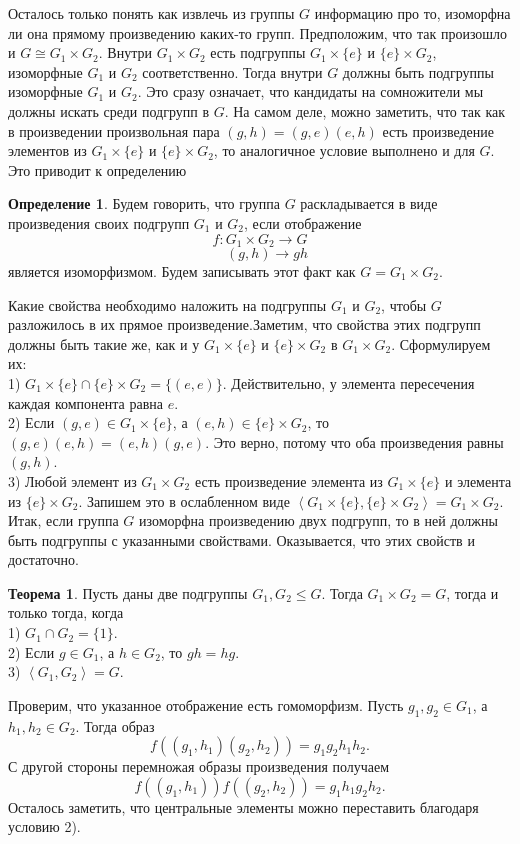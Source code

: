 \documentclass[10pt,a4paper,oneside]{book}
\theoremstyle{definition}
\newtheorem*{defn}{\color{yellow!30!red} Определение}
\newtheorem{thm}{\color{red!40!black}Теорема}
\renewcommand{\leq}{\leqslant}
\def\lan{\left\langle }
\def\ran{\right\rangle}
\def\thrm{\begin{thm}}
\def\ethrm{\end{thm}}
\def\dfn{\begin{defn}}
\def\edfn{\end{defn}}
\begin{document}
Осталось только понять как извлечь из группы $G$ информацию про то, изоморфна ли она прямому произведению каких-то групп. Предположим, что так произошло и $G\cong G_1\times G_2$. Внутри $G_1\times G_2$ есть подгруппы $G_1\times \{e\}$ и $\{e\}\times G_2$, изоморфные $G_1$ и $G_2$ соответственно. Тогда внутри $G$ должны быть подгруппы изоморфные $G_1$ и $G_2$. Это сразу означает, что кандидаты на сомножители мы должны искать среди подгрупп в $G$. На самом деле, можно заметить, что так как в произведении произвольная пара $(g,h)=(g,e)(e,h)$ есть произведение элементов из $G_1\times \{e\}$ и $\{e\}\times G_2$, то аналогичное условие выполнено и для $G$. Это приводит к определению

\dfn Будем говорить, что группа $G$ раскладывается в виде произведения своих подгрупп $G_1$ и $G_2$, если отображение
$$f\colon G_1\times G_2 \to G$$
$$\quad (g,h)\to gh$$
является изоморфизмом. Будем записывать этот факт как $G=G_1\times G_2$.
\edfn

Какие свойства необходимо наложить на подгруппы $G_1$ и $G_2$, чтобы $G$ разложилось в их прямое произведение.Заметим, что свойства этих подгрупп должны быть такие же, как и у $G_1\times \{e\}$ и $\{e\}\times G_2$ в $G_1\times G_2$. Сформулируем их:\\
1) $G_1\times \{e\} \cap \{e\}\times G_2 =\{(e,e)\}$. Действительно, у элемента пересечения каждая компонента равна $e$.\\
2) Если $(g,e)\in G_1\times \{e\}$, а $(e,h)\in \{e\}\times G_2$, то $(g,e)(e,h)=(e,h)(g,e)$. Это верно, потому что оба произведения равны $(g,h)$.\\
3) Любой элемент из $G_1\times G_2$ есть произведение элемента из $G_1\times \{e\}$  и элемента из $\{e\}\times G_2$. Запишем это в ослабленном виде $\lan G_1\times \{e\},\{e\}\times G_2\ran = G_1\times G_2$.\\

Итак, если группа $G$ изоморфна произведению двух подгрупп, то в ней должны быть подгруппы с указанными свойствами. Оказывается, что этих свойств и достаточно.

\thrm Пусть даны две подгруппы $G_1,G_2 \leq G$. Тогда $G_1\times G_2=G$, тогда и только тогда, когда\\
1) $G_1\cap G_2 =\{1\}$.\\
2) Если $g\in G_1$, а $h\in G_2$, то $gh=hg$.\\
3) $\lan G_1,G_2\ran = G$.
\ethrm
\proof Проверим, что указанное отображение есть гомоморфизм. Пусть $g_1,g_2 \in G_1$, а $h_1,h_2\in G_2$. Тогда образ $$f((g_1,h_1)(g_2,h_2))=g_1g_2 h_1h_2.$$
С другой стороны перемножая образы произведения получаем 
$$f((g_1,h_1))f((g_2,h_2))=g_1h_1 g_2h_2.$$
Осталось заметить, что центральные элементы можно переставить благодаря условию 2).
\end{document}
